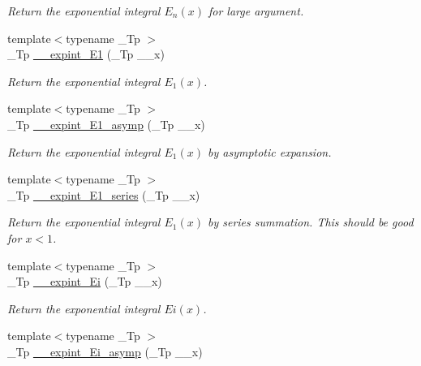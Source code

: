 \begin{DoxyCompactItemize}
\begin{DoxyCompactList}\small\item\em Return the exponential integral $ E_n(x) $ for large argument. \end{DoxyCompactList}\item 
{\footnotesize template$<$typename \+\_\+\+Tp $>$ }\\\+\_\+\+Tp \hyperlink{namespacestd_1_1____detail_a665eb0c524b929c035d88bbb17815917}{\+\_\+\+\_\+expint\+\_\+\+E1} (\+\_\+\+Tp \+\_\+\+\_\+x)
\begin{DoxyCompactList}\small\item\em Return the exponential integral $ E_1(x) $. \end{DoxyCompactList}\item 
{\footnotesize template$<$typename \+\_\+\+Tp $>$ }\\\+\_\+\+Tp \hyperlink{namespacestd_1_1____detail_abd02a300cd209be618a6e054a706c012}{\+\_\+\+\_\+expint\+\_\+\+E1\+\_\+asymp} (\+\_\+\+Tp \+\_\+\+\_\+x)
\begin{DoxyCompactList}\small\item\em Return the exponential integral $ E_1(x) $ by asymptotic expansion. \end{DoxyCompactList}\item 
{\footnotesize template$<$typename \+\_\+\+Tp $>$ }\\\+\_\+\+Tp \hyperlink{namespacestd_1_1____detail_ad162f66405bde5ccd5a7cdabbe1966f7}{\+\_\+\+\_\+expint\+\_\+\+E1\+\_\+series} (\+\_\+\+Tp \+\_\+\+\_\+x)
\begin{DoxyCompactList}\small\item\em Return the exponential integral $ E_1(x) $ by series summation. This should be good for $ x < 1 $. \end{DoxyCompactList}\item 
{\footnotesize template$<$typename \+\_\+\+Tp $>$ }\\\+\_\+\+Tp \hyperlink{namespacestd_1_1____detail_ab2f8bf37caa4993de28306a2a634ed6f}{\+\_\+\+\_\+expint\+\_\+\+Ei} (\+\_\+\+Tp \+\_\+\+\_\+x)
\begin{DoxyCompactList}\small\item\em Return the exponential integral $ Ei(x) $. \end{DoxyCompactList}\item 
{\footnotesize template$<$typename \+\_\+\+Tp $>$ }\\\+\_\+\+Tp \hyperlink{namespacestd_1_1____detail_ac272ec880c6d4be02b56089a1cebc46d}{\+\_\+\+\_\+expint\+\_\+\+Ei\+\_\+asymp} (\+\_\+\+Tp \+\_\+\+\_\+x)

\end{DoxyCompactItemize}
